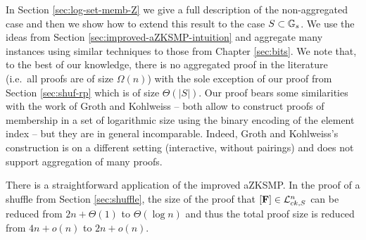 In Section \ref{sec:log-set-memb-Z} we give a full description of the non-aggregated case and then we show how to extend this result to the case $S\subset\mathbb{G}_s$. We use the ideas from Section \ref{sec:improved-aZKSMP-intuition} and aggregate many instances using similar techniques to those from Chapter \ref{sec:bits}. We note that, to the best of our knowledge, there is no aggregated proof in the literature (i.e.~all proofs are of size $\Omega(n)$) with the sole exception of our proof from Section \ref{sec:shuf-rp} which is of size $\Theta(|S|)$.  
Our proof bears some similarities with the work of Groth and Kohlweiss \cite{EC:GroKoh15} -- both allow to construct proofs of membership in a set of logarithmic size using the binary encoding of the element index -- but they are in general incomparable. Indeed, Groth and Kohlweiss's construction is on a different setting (interactive, without pairings) and does not support aggregation of many proofs.

There is a straightforward application of the improved aZKSMP. In the proof of a shuffle from Section \ref{sec:shuffle}, the size of the proof that $[\mathbf{{F}}]\in\mathcal{L}_{ck,S}^n$ can be reduced from $2n+\Theta(1)$ to $\Theta(\log n)$ and thus the total proof size is reduced from $4n+o(n)$ to $2n+o(n)$.



